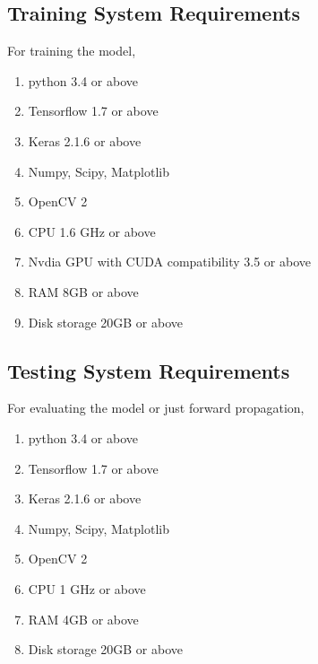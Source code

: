 \subsection{Training System Requirements} %
\label{sub:training_system_requirements}
For training the model,
\begin{enumerate}
    \item python 3.4 or above
    \item Tensorflow 1.7 or above
    \item Keras  2.1.6 or above
    \item Numpy, Scipy, Matplotlib
    \item OpenCV 2
    \item CPU 1.6 GHz or above
    \item Nvdia GPU with CUDA compatibility 3.5 or above
    \item RAM 8GB or above
    \item Disk storage 20GB or above
\end{enumerate}

\subsection{Testing System Requirements} %
\label{sub:Testing_system_requirements}
For evaluating the model or just forward propagation,
\begin{enumerate}
    \item python 3.4 or above
    \item Tensorflow 1.7 or above
    \item Keras  2.1.6 or above
    \item Numpy, Scipy, Matplotlib
    \item OpenCV 2
    \item CPU 1 GHz or above
    \item RAM 4GB or above
    \item Disk storage 20GB or above
\end{enumerate}
